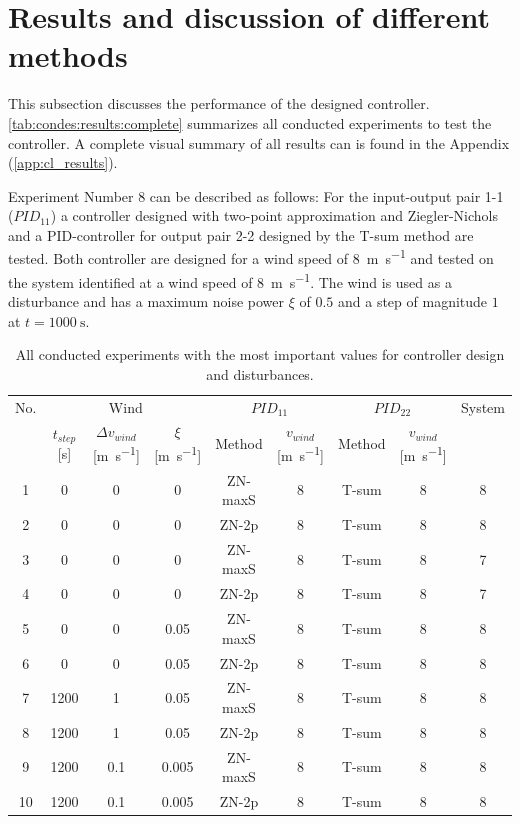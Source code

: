 \section{Results and discussion of different methods} \label{sec:condes:discussion}

This subsection discusses the performance of the designed controller.
\autoref{tab:condes:results:complete} summarizes all conducted experiments to test the controller.
A complete visual summary of all results can is found in the Appendix (\autoref{app:cl_results}).

Experiment Number 8 can be described as follows:
For the input-output pair 1-1 ($PID_{11}$) a controller designed with two-point approximation and Ziegler-Nichols and a PID-controller for output pair 2-2 designed by the T-sum method are tested.
Both controller are designed for a wind speed of \SI{8}{\metre\per\second} and tested on the system identified at a wind speed of \SI{8}{\metre\per\second}.
The wind is used as a disturbance and has a maximum noise power $\xi$ of $0.5$ and a step of magnitude $1$ at $t=\SI{1000}{\second}$. 


\begin{table}[H]
    \caption{All conducted experiments with the most important values for controller design and disturbances.}
    \centering
    \begin{tabular}{ccccccccc} \toprule
        No. & \multicolumn{3}{c}{Wind} & \multicolumn{2}{c}{$PID_{11}$} & \multicolumn{2}{c}{$PID_{22}$} & System \\ 
          &  $t_{step}$ [\si{\second}] & $ \Delta v_{wind}$ [\si{\metre\per\second}] & $\xi$ [\si{\metre\per\second}]    & Method  &  $v_{wind}$ [\si{\metre\per\second}] & Method  &  $v_{wind}$ [\si{\metre\per\second}]  \\ \midrule
        1 & 0 & 0 & 0 & ZN-maxS & 8 & T-sum & 8 & 8\\ 
        2 & 0 & 0 & 0 & ZN-2p   & 8 & T-sum & 8 & 8\\ 
        3 & 0 & 0 & 0 & ZN-maxS & 8 & T-sum & 8 & 7\\ 
        4 & 0 & 0 & 0 & ZN-2p   & 8 & T-sum & 8 & 7\\
        5 & 0 & 0 & 0.05 & ZN-maxS & 8 & T-sum & 8 & 8\\ 
        6 & 0 & 0 & 0.05 & ZN-2p   & 8 & T-sum & 8 & 8\\
        7 & 1200 & 1 & 0.05 & ZN-maxS & 8 & T-sum & 8 & 8\\ 
        8 & 1200 & 1 & 0.05 & ZN-2p   & 8 & T-sum & 8 & 8\\
        9 & 1200 & 0.1 & 0.005 & ZN-maxS & 8 & T-sum & 8 & 8\\ 
        10 & 1200 & 0.1 & 0.005 & ZN-2p   & 8 & T-sum & 8 & 8\\ \bottomrule
    \end{tabular}
    \label{tab:condes:results:complete}
\end{table}



